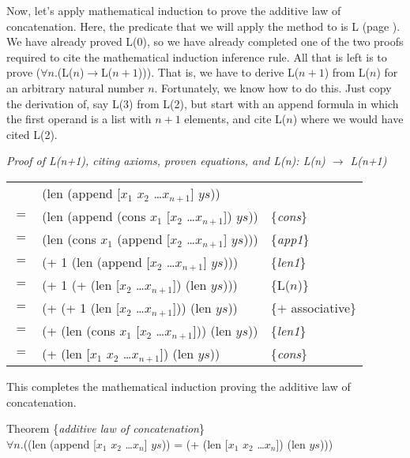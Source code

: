 \label{induction-hyp-def}Now,
let's apply mathematical induction to prove
the additive law of concatenation.
Here, the predicate that we will apply the method to is L
(page \pageref{additive-concat-law-predicate}).
\label{len-additive-thm}We
have already proved L(0), so we have already completed one of the
two proofs required to cite the mathematical induction inference rule.
All that is left is to prove ($\forall$$n$.(L($n$)$\rightarrow$L($n+1$))).
That is, we have to derive L($n+1$) from L($n$) for an arbitrary natural number $n$.
Fortunately, we know how to do this. Just copy the derivation of,
say L(3) from L(2), but start with an append formula in which the first operand
is a list with $n+1$ elements, and cite L($n$) where we would have cited L(2).

\begin{center}
\emph{Proof of L(n+1), citing axioms, proven equations, and L(n): L(n) $\rightarrow$ L(n+1)}\\
\begin{tabular}{lll}
    & (len (append [$x_1$ $x_2$ \dots $x_{n+1}$] $ys$))         &                     \\
$=$ & (len (append (cons $x_1$ [$x_2$ \dots $x_{n+1}$]) $ys$))  & \{\emph{cons}\}     \\
$=$ & (len (cons $x_1$ (append [$x_2$ \dots $x_{n+1}$] $ys$)))  & \{\emph{app1}\}     \\
$=$ & (+ 1 (len (append [$x_2$ \dots $x_{n+1}$] $ys$)))         & \{\emph{len1}\}     \\
$=$ & (+ 1 (+ (len [$x_2$ \dots $x_{n+1}$]) (len $ys$)))        & \{L($n$)\}          \\
$=$ & (+ (+ 1 (len [$x_2$ \dots $x_{n+1}$])) (len $ys$))        & \{$+$ associative\} \\
$=$ & (+ (len (cons $x_1$ [$x_2$ \dots $x_{n+1}$])) (len $ys$)) & \{\emph{len1}\}     \\
$=$ & (+ (len [$x_1$ $x_2$ \dots $x_{n+1}$]) (len $ys$))        & \{\emph{cons}\}     \\
\end{tabular}
\end{center}

This completes the mathematical induction proving the
additive law of concatenation.
\begin{samepage}
\begin{center}
\label{additive-law-concatenation}
Theorem \{\emph{additive law of concatenation}\} \\
$\forall$$n$.((len (append [$x_1$ $x_2$ \dots $x_n$] $ys$))
= (+ (len [$x_1$ $x_2$ \dots $x_n$]) (len $ys$)))
\end{center}
\end{samepage}

